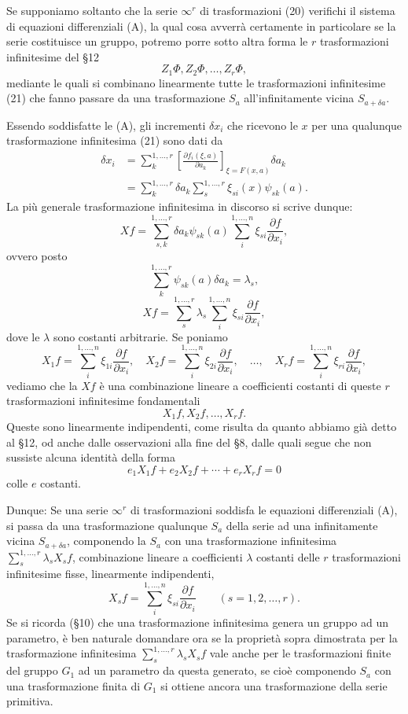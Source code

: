 \documentclass[11pt]{book}
\begin{document}
Se supponiamo soltanto che la serie $\infty^r$ di trasformazioni (20) verifichi il sistema di equazioni differenziali (A), la qual cosa avverrà certamente in particolare se la serie costituisce un gruppo, potremo porre sotto altra forma le $r$ trasformazioni infinitesime del \S{}12
\[
 Z_1\Phi,
 Z_2\Phi,
 \ldots,
 Z_r\Phi,
\]
mediante le quali si combinano linearmente tutte le trasformazioni infinitesime (21) che fanno passare da una trasformazione $S_a$ all'infinitamente vicina $S_{a+\delta a}$.

Essendo soddisfatte le (A), gli incrementi $\delta x_i$ che ricevono le $x$ per una qualunque trasformazione infinitesima (21) sono dati da
\[
\begin{aligned}
 \delta x_i
 &=\sum\limits_k^{1,\ldots,r}\left[\frac{\partial f_i(\xi,a)}{\partial a_k}\right]_{\xi=F(x,a)}\delta a_k\\
 &=\sum\limits_k^{1,\ldots,r}\delta a_k\sum\limits_s^{1,\ldots,r}\xi_{si}(x)\psi_{sk}(a).
\end{aligned}
\]
La più generale trasformazione infinitesima in discorso si scrive dunque:
\[
 Xf=\sum\limits_{s,k}^{1,\ldots,r}\delta a_k\psi_{sk}(a)\sum\limits_i^{1,\ldots,n}\xi_{si}\frac{\partial f}{\partial x_i},
\]
ovvero posto
\[
 \sum\limits_k^{1,\ldots,r}\psi_{sk}(a)\delta a_k=\lambda_s,
\]
\[
 Xf=\sum\limits_s^{1,\ldots,r}\lambda_s\sum\limits_i^{1,\ldots,n}\xi_{si}\frac{\partial f}{\partial x_i},
\]
dove le $\lambda$ sono costanti arbitrarie. Se poniamo
\begin{equation*}\tag{31}
 X_1f=\sum\limits_i^{1,\ldots,n}\xi_{1i}\frac{\partial f}{\partial x_i},\quad
 X_2f=\sum\limits_i^{1,\ldots,n}\xi_{2i}\frac{\partial f}{\partial x_i},\quad \ldots,\quad
 X_rf=\sum\limits_i^{1,\ldots,n}\xi_{ri}\frac{\partial f}{\partial x_i},
\end{equation*}
vediamo che la $Xf$ è una combinazione lineare a coefficienti costanti di queste $r$ trasformazioni infinitesime fondamentali
\[
 X_1f,
 X_2f,
 \ldots,
 X_rf.
\]
Queste sono linearmente indipendenti, come risulta da quanto abbiamo già detto al \S{}12, od anche dalle osservazioni alla fine del \S{}8, dalle quali segue che non sussiste alcuna identità della forma
\[
 e_1X_1f+e_2X_2f+\cdots+e_rX_rf=0
\]
colle $e$ costanti.

Dunque: Se una serie $\infty^r$ di trasformazioni soddisfa le equazioni differenziali (A), si passa da una trasformazione qualunque $S_a$ della serie ad una infinitamente vicina $S_{a+\delta a}$, componendo la $S_a$ con una trasformazione infinitesima $\sum\limits_s^{1,\ldots,r}\lambda_sX_sf$, combinazione lineare a coefficienti $\lambda$ costanti delle $r$ trasformazioni infinitesime fisse, linearmente indipendenti,
\[
 X_sf=\sum\limits_i^{1,\ldots,n}\xi_{si}\frac{\partial f}{\partial x_i}\qquad(s=1,2,\ldots,r).
\]
Se si ricorda (\S{}10) che una trasformazione infinitesima genera un gruppo ad un parametro, è ben naturale domandare ora se la proprietà sopra dimostrata per la trasformazione infinitesima $\sum\limits_s^{1,\ldots,r}\lambda_sX_sf$ vale anche per le trasformazioni finite del gruppo $G_1$ ad un parametro da questa generato, se cioè componendo $S_a$ con una trasformazione finita di $G_1$ si ottiene ancora una trasformazione della serie primitiva.
\end{document}
